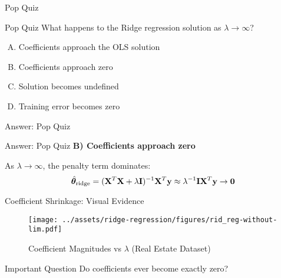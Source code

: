 \documentclass{beamer}
\begin{document}

\begin{frame}{Pop Quiz \thepopquiz}
\begin{popquizbox}{Pop Quiz \thepopquiz}
What happens to the Ridge regression solution as $\lambda \to \infty$?
\begin{enumerate}[A)]
\item Coefficients approach the OLS solution
\item Coefficients approach zero
\item Solution becomes undefined
\item Training error becomes zero
\end{enumerate}
\end{popquizbox}
\end{frame}

\begin{frame}{Answer: Pop Quiz \thepopquiz}
\begin{popquizbox}{Answer: Pop Quiz \thepopquiz}
\textbf{B) Coefficients approach zero}

\vspace{0.3cm}
As $\lambda \to \infty$, the penalty term dominates:
$$\hat{\boldsymbol{\theta}}_{\text{ridge}} = (\mathbf{X}^T\mathbf{X} + \lambda\mathbf{I})^{-1}\mathbf{X}^T\mathbf{y} \approx \lambda^{-1}\mathbf{I} \mathbf{X}^T\mathbf{y} \to \mathbf{0}$$
\end{popquizbox}
\end{frame}

\begin{frame}{Coefficient Shrinkage: Visual Evidence}
\begin{figure}\texttt{[image: ../assets/ridge-regression/figures/rid\_reg-without-lim.pdf]}\caption{Coefficient Magnitudes vs $\lambda$ (Real Estate Dataset)}
\end{figure}

\begin{alertbox}{Important Question}
Do coefficients ever become exactly zero?
\end{alertbox}
\end{frame}
\end{document}
